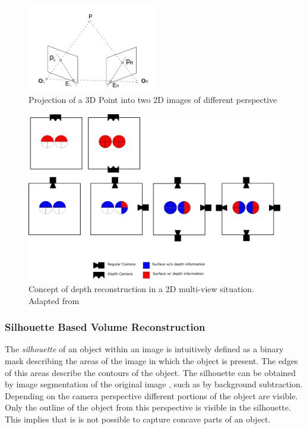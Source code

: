 \begin{figure}[hbt]
	\centering
	\includegraphics[width=0.5\textwidth, keepaspectratio]{resources/Epipolar_Geometry}
	\caption[]{\label{fig:sota:epipolar} Projection of a 3D Point into two 2D images of different perspective}
\end{figure}

\begin{figure}[hbt]
	\centering
	\includegraphics[width=1.0\textwidth, keepaspectratio]{resources/multiview}
	\caption[Concept of depth reconstruction in a 2D multi-view situation]{\label{fig:sota:mulitviewtop}Concept of depth reconstruction in a 2D multi-view situation.
	Adapted from \textcite[][]{sonaten2011volume}}
\end{figure}



\subsubsection{Silhouette Based Volume Reconstruction}

The \emph{silhouette} of an object within an image is intuitively defined 
as a binary mask describing the areas of the image in which the object is present. 
The edges of this areas describe the contours of the object.
The silhouette can be obtained by image segmentation of the original image \autocite[][Chap.~2]{zhang2017imageanalysis}, such as by background subtraction.
Depending on the camera perspective different portions of the object are visible.
Only the outline of the object from this perspective is visible in the silhouette.
This implies that is is not possible to capture concave parts of an object.

